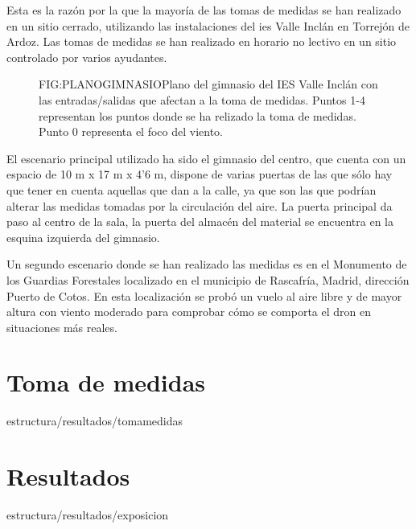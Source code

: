 Esta es la razón por la que la mayoría de las tomas de medidas se han realizado en un sitio cerrado, utilizando las instalaciones del \ac{ies} Valle Inclán en Torrejón de Ardoz. Las tomas de medidas se han realizado en horario no lectivo en un sitio controlado por varios ayudantes.

\begin{figure}[Plano gimnasio IES Valle Inclán]{FIG:PLANOGIMNASIO}{Plano del gimnasio del IES Valle Inclán con las entradas/salidas que afectan a la toma de medidas. Puntos 1-4 representan los puntos donde se ha relizado la toma de medidas. Punto 0 representa el foco del viento.}
\end{figure}

El escenario principal utilizado ha sido el gimnasio del centro, que cuenta con un espacio de 10 m x 17 m x 4'6 m, dispone de varias puertas de las que sólo hay que tener en cuenta aquellas que dan a la calle, ya que son las que podrían alterar las medidas tomadas por la circulación del aire. La puerta principal da paso al centro de la sala, la puerta del almacén del material se encuentra en la esquina izquierda del gimnasio. 

Un segundo escenario donde se han realizado las medidas es en el Monumento de los Guardias Forestales localizado en el municipio de Rascafría, Madrid, dirección Puerto de Cotos. En esta localización se probó un vuelo al aire libre y de mayor altura con viento moderado para comprobar cómo se comporta el dron en situaciones más reales.

\section{Toma de medidas\label{SEC:TOMAMEDIDAS}}{estructura/resultados/tomamedidas}
\section{Resultados\label{SEC:EXPOSICION}}{estructura/resultados/exposicion}

